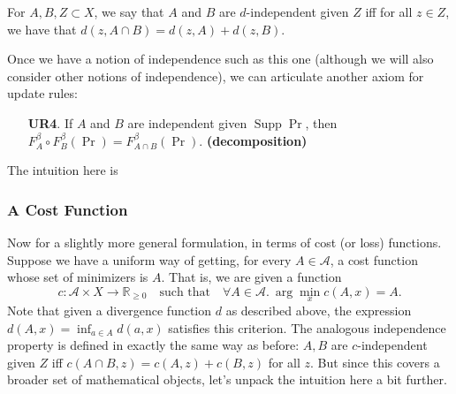 \documentclass{article}
\DeclareMathOperator{\supp}{\mathrm{Supp}}
\begin{document}
\begin{defn}[$d$-independence]
For $A,B,Z \subset X$,
we say that $A$ and $B$ are $d$-independent given $Z$ iff
for all $z \in Z$, we have that
$d(z, A \cap B) = d(z, A) + d(z,B)$.
\end{defn}

Once we have a notion of independence such as this one (although we will also consider other notions of independence), we can articulate another axiom for update rules:

\begin{enumerate}[resume,label=\textbf{UR\arabic{*}.},nosep,leftmargin=2cm]
    \item[\textbf{UR4}.] 
    If $A$ and $B$ are independent given $\supp \Pr$, then \\
    $F^{\beta}_A \circ F^{\beta}_B (\Pr) = F^{\beta}_{A \cap B}(\Pr)$.
        \hfill \textbf{(decomposition)}
\end{enumerate}
The intuition here is 

\bigskip


\subsubsection*{A Cost Function}
Now for a slightly more general formulation, in terms of cost (or loss) functions.
Suppose we have a uniform way of getting, for every $A \in \mathcal A$, a cost function whose set of minimizers is $A$. That is, we are given a function
\[ c : \mathcal A \times X \to \mathbb R_{\ge 0}
\quad\text{such that}\quad
\forall A \in \mathcal A.~\arg\min_{x} c(A, x) = A.
\]
Note that given a divergence function $d$ as described above, the expression $d(A, x) = \inf_{a \in A} d(a,x)$ satisfies this criterion. The analogous independence property is defined in exactly the same way as before:
$A, B$ are $c$-independent given $Z$ iff $c(A \cap B, z) = c(A, z) + c(B, z)$ for all $z$.
But since this covers a broader set of mathematical objects, let's unpack the intuition here a bit further.
\end{document}
